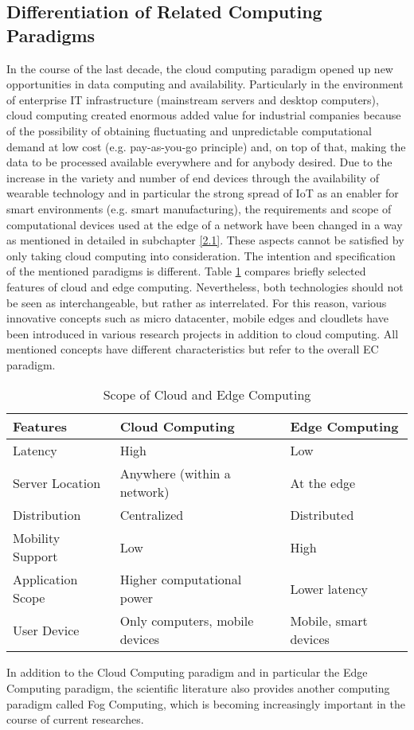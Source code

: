 \subsection{Differentiation of Related Computing Paradigms}
In the course of the last decade, the cloud computing paradigm opened up new opportunities in data computing and availability. Particularly in the environment of enterprise IT infrastructure (mainstream servers and desktop computers), cloud computing created enormous added value for industrial companies because of the possibility of obtaining fluctuating and unpredictable computational demand at low cost (e.g. pay-as-you-go principle) and, on top of that, making the data to be processed available everywhere and for anybody desired.
Due to the increase in the variety and number of end devices through the availability of wearable technology and in particular the strong spread of IoT as an enabler for smart environments (e.g. smart manufacturing), the requirements and scope of computational devices used at the edge of a network have been changed in a way as mentioned in detailed in subchapter \ref{2.1}. These aspects cannot be satisfied by only taking cloud computing into consideration.
The intention and specification of the mentioned paradigms is different. Table \ref{table:1}  compares briefly selected features of cloud and edge computing. Nevertheless, both technologies should not be seen as interchangeable, but rather as interrelated.
For this reason, various innovative concepts such as micro datacenter, mobile edges and cloudlets have been introduced in various research projects in addition to cloud computing.
All mentioned concepts have different characteristics but refer to the overall EC paradigm.

\begin{table}[h!] 
\centering
\begin{tabular}{ |p{2.7cm}|p{4.6cm}|p{4.4cm}|  }
 \hline
 Features & Cloud Computing & Edge Computing \\ [0.5ex] 
 \hline\hline
Latency & High & Low \\
Server Location & Anywhere (within a network) & At the edge \\
Distribution & Centralized & Distributed \\
Mobility Support & Low & High \\
Application Scope & Higher computational power & Lower latency \\
User Device & Only computers, mobile devices & Mobile, smart devices \\
 \hline
\end{tabular}
\caption{Scope of Cloud and Edge Computing}
\label{table:1}
\end{table}
In addition to the Cloud Computing paradigm and in particular the Edge Computing paradigm, the scientific literature also provides another computing paradigm called Fog Computing, which is becoming increasingly important in the course of current researches. 

